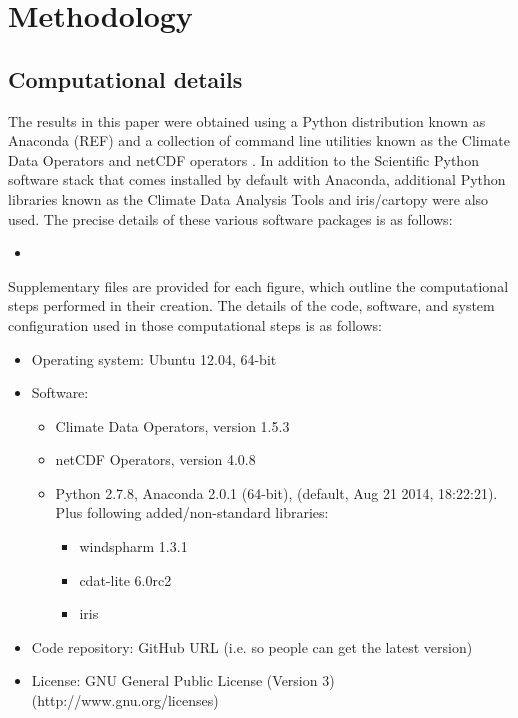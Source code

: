 \section{Methodology}\label{s:methodology}

\subsection{Computational details}\label{s:computational_details}

The results in this paper were obtained using a Python distribution known as Anaconda (REF) and a collection of command line utilities known as the Climate Data Operators \citep[CDO;][]{Schulzweida2014} and netCDF operators \citep[NCO;][]{Zender2014}. In addition to the Scientific Python \citep[SciPy;][]{SciPy} software stack that comes installed by default with Anaconda, additional Python libraries known as the Climate Data Analysis Tools \citep[CDAT;][]{Doutriaux2009} and iris/cartopy \citep{Iris} were also used. The precise details of these various software packages is as follows:
\begin{itemize}
\item 
\end{itemize}


Supplementary files are provided for each figure, which outline the computational steps performed in their creation. The details of the code, software, and system configuration used in those computational steps is as follows:   
\begin{itemize}
\item Operating system: Ubuntu 12.04, 64-bit %
\item Software: 
\begin{itemize}
\item Climate Data Operators, version 1.5.3 \citep{Schulzweida2014} %
\item netCDF Operators, version 4.0.8 \citep{Zender2014} %
\item Python 2.7.8, Anaconda 2.0.1 (64-bit), (default, Aug 21 2014, 18:22:21). Plus following added/non-standard libraries:  %
\begin{itemize}
\item windspharm 1.3.1 %
\item cdat-lite 6.0rc2 %
\item iris \citep{Iris}
\end{itemize}
\end{itemize}
\item Code repository: GitHub URL (i.e. so people can get the latest version)
\item License: GNU General Public License (Version 3) (http://www.gnu.org/licenses) %
\end{itemize}



